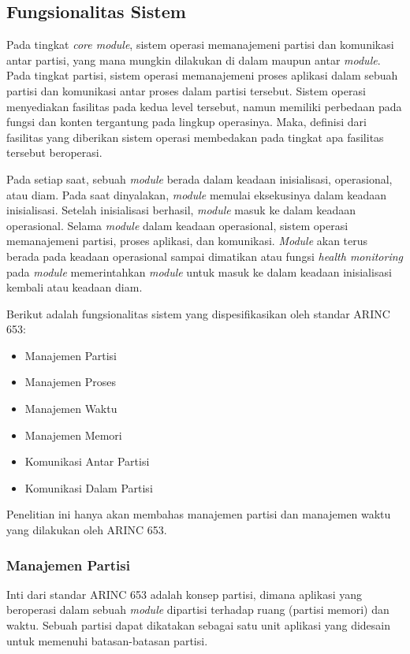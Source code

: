 \subsection{Fungsionalitas Sistem}

Pada tingkat \textit{core module}, sistem operasi memanajemeni partisi dan komunikasi antar partisi, yang mana mungkin dilakukan di dalam maupun antar \textit{module}.
Pada tingkat partisi, sistem operasi memanajemeni proses aplikasi dalam sebuah partisi dan komunikasi antar proses dalam partisi tersebut.
Sistem operasi menyediakan fasilitas pada kedua level tersebut, namun memiliki perbedaan pada fungsi dan konten tergantung pada lingkup operasinya.
Maka, definisi dari fasilitas yang diberikan sistem operasi membedakan pada tingkat apa fasilitas tersebut beroperasi.

Pada setiap saat, sebuah \textit{module} berada dalam keadaan inisialisasi, operasional, atau diam.
Pada saat dinyalakan, \textit{module} memulai eksekusinya dalam keadaan inisialisasi.
Setelah inisialisasi berhasil, \textit{module} masuk ke dalam keadaan operasional.
Selama \textit{module} dalam keadaan operasional, sistem operasi memanajemeni partisi, proses aplikasi, dan komunikasi.
\textit{Module} akan terus berada pada keadaan operasional sampai dimatikan atau fungsi \textit{health monitoring} pada \textit{module} memerintahkan \textit{module} untuk masuk ke dalam keadaan inisialisasi kembali atau keadaan diam.

Berikut adalah fungsionalitas sistem yang dispesifikasikan oleh standar ARINC 653:
\begin{itemize}
    \item Manajemen Partisi
    \item Manajemen Proses
    \item Manajemen Waktu
    \item Manajemen Memori
    \item Komunikasi Antar Partisi
    \item Komunikasi Dalam Partisi
\end{itemize}
Penelitian ini hanya akan membahas manajemen partisi dan manajemen waktu yang dilakukan oleh ARINC 653.

\subsubsection[Manajemen Partisi]{Manajemen Partisi}

Inti dari standar ARINC 653 adalah konsep partisi, dimana aplikasi yang beroperasi dalam sebuah \textit{module} dipartisi terhadap ruang (partisi memori) dan waktu.
Sebuah partisi dapat dikatakan sebagai satu unit aplikasi yang didesain untuk memenuhi batasan-batasan partisi.

